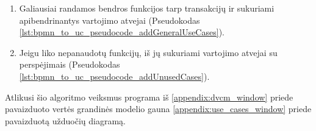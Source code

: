 \begin{enumerate}
	\item Galiausiai randamos bendros funkcijos tarp transakcijų ir sukuriami apibendrinantys vartojimo atvejai (Pseudokodas  \ref{lst:bpmn_to_uc_pseudocode_addGeneralUseCases}).
	
	\item Jeigu liko nepanaudotų funkcijų, iš jų sukuriami vartojimo atvejai su perspėjimais (Pseudokodas \ref{lst:bpmn_to_uc_pseudocode_addUnusedCases}).
	
\end{enumerate} 

Atlikusi šio algoritmo veiksmus programa iš \ref{appendix:dvcm_window} priede pavaizduoto vertės grandinės modelio gauna \ref{appendix:use_cases_window} priede pavaizduotą užduočių diagramą.

